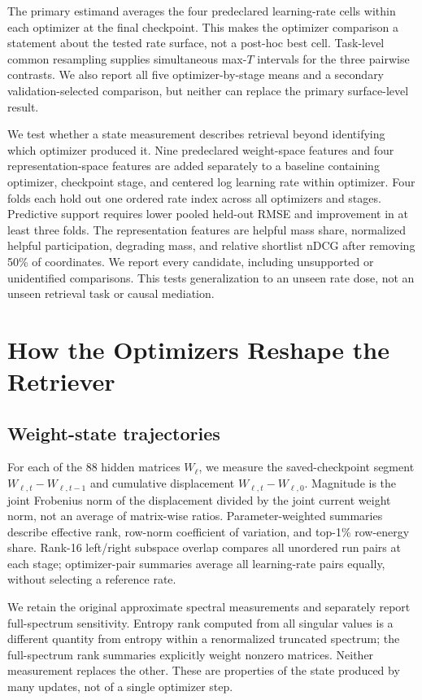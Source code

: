 \documentclass[11pt]{article}
\begin{document}
The primary estimand averages the four predeclared learning-rate cells within each optimizer at the
final checkpoint. This makes the optimizer comparison a statement about the tested rate surface,
not a post-hoc best cell. Task-level common resampling supplies simultaneous max-$T$ intervals for
the three pairwise contrasts. We also report all five optimizer-by-stage means and a secondary
validation-selected comparison, but neither can replace the primary surface-level result.

We test whether a state measurement describes retrieval beyond identifying which optimizer
produced it. Nine predeclared weight-space features and four representation-space features are
added separately to a baseline containing optimizer, checkpoint stage, and centered log learning
rate within optimizer. Four folds each hold out one ordered rate index across all optimizers and
stages. Predictive support requires lower pooled held-out RMSE and improvement in at least three
folds. The representation features are helpful mass share, normalized helpful participation,
degrading mass, and relative shortlist nDCG after removing 50\% of coordinates. We report every
candidate, including unsupported or unidentified comparisons. This tests generalization to an
unseen rate dose, not an unseen retrieval task or causal mediation.

\CorrectedMainSection

\section{How the Optimizers Reshape the Retriever}

\subsection{Weight-state trajectories}

For each of the 88 hidden matrices $W_\ell$, we measure the saved-checkpoint segment
$W_{\ell,t}-W_{\ell,t-1}$ and cumulative displacement $W_{\ell,t}-W_{\ell,0}$. Magnitude is the
joint Frobenius norm of the displacement divided by the joint current weight norm, not an average
of matrix-wise ratios. Parameter-weighted summaries describe effective rank, row-norm coefficient
of variation, and top-1\% row-energy share. Rank-16 left/right subspace overlap compares all
unordered run pairs at each stage; optimizer-pair summaries average all learning-rate pairs
equally, without selecting a reference rate.

We retain the original approximate spectral measurements and separately report full-spectrum
sensitivity. Entropy rank computed from all singular values is a different quantity from entropy
within a renormalized truncated spectrum; the full-spectrum rank summaries explicitly weight
nonzero matrices. Neither measurement replaces the other. These are properties of the state
produced by many updates, not of a single optimizer step.
\end{document}
